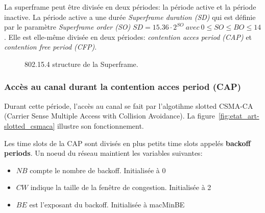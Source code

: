   La superframe peut être divisée en deux périodes: la période active et la période inactive.
  La période active a une durée \textit{Superframe duration (SD)} qui est définie par 
  le paramètre \textit{Superframe order (SO)} $SD=15.36 \cdot 2^{SO}\ avec\ 0 \leq SO \leq BO \leq 14$.
  Elle est elle-même divisée en deux périodes:
  \textit{contention acces period (CAP)} et \textit{contention free period (CFP)}.
  \begin{figure}[H]
    \centering
    \caption{802.15.4 structure de la Superframe.}
    \label{fig:etat_art-802.15.4.superframe}
  \end{figure}

\subsubsection*{Accès au canal durant la contention acces period (CAP)}
  Durant cette période, l'accès au canal se fait par l'algotihme slotted CSMA-CA
  (Carrier Sense Multiple Access with Collision Avoidance). La figure~\ref{fig:etat_art-slotted_csmaca}
  illustre son fonctionnement.

  Les time slots de la CAP sont divisés en plus petits time slots appelés \textbf{backoff periods}.
  Un noeud du réseau maintient les variables suivantes:
  \begin{itemize}
    \item $NB$ compte le nombre de backoff. Initialisée à 0
    \item $CW$ indique la taille de la fenêtre de congestion. Initialisée à 2
    \item $BE$ est l'exposant du backoff. Initialisée à macMinBE
  \end{itemize}

